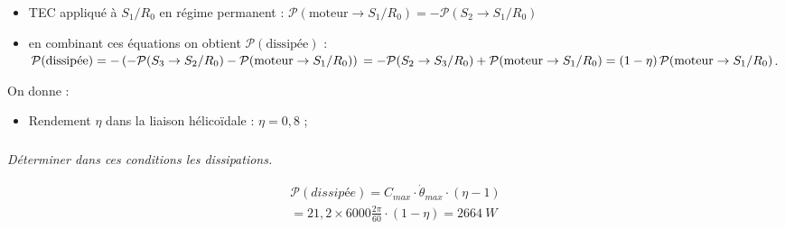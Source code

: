 \documentclass[10pt,fleqn]{article} %
\begin{document}
\begin{multicols}{2}
\begin{corrige}
\begin{itemize}
\item TEC appliqué à $S_1/R_0$ en régime permanent :
$\mathcal{P}(\text{moteur}\to S_1/R_0)=-\mathcal{P}(S_2\to S_1/R_0)$
\item en combinant ces équations on obtient $\mathcal{P}(\text{dissipée})$ : 
$\mathcal{P}(\text{dissipée})=-\left(-\mathcal{P}(S_3\to S_2/R_0)-\mathcal{P}(\text{moteur}\to S_1/R_0)\right)\\
=-\mathcal{P}(S_2\to S_3/R_0)+\mathcal{P}(\text{moteur}\to S_1/R_0)=\left(1-\eta\right)\mathcal{P}(\text{moteur}\to S_1/R_0)$.
\end{itemize}
\end{corrige}\else\fi

\vspace{.5cm}
On donne : 
\begin{itemize}
\item Rendement $\eta$ dans la liaison hélicoïdale : $\eta=0,8$ ; 
\end{itemize}

\subparagraph{}\textit{Déterminer dans ces conditions les dissipations.}

\ifprof\begin{corrige}
\begin{align*}
\mathcal{P}(dissipée)=C_{max}\cdot \dot{\theta}_{max}\cdot \left(\eta-1\right)\\
=21,2\times6000\frac{2\pi}{60}\cdot \left(1-\eta\right)=\SI{2664}{W}
\end{align*}
\end{corrige}\else\fi




\ifprof
\else
\end{multicols}
\fi
\end{document}
